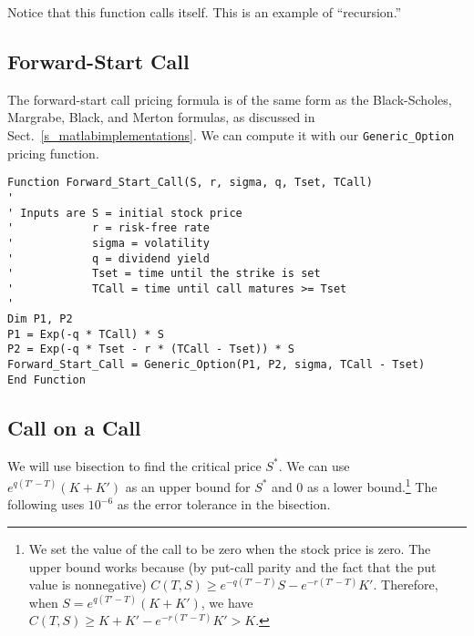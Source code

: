 \noindent Notice that this function calls itself.  This is an example of ``recursion.''


\subsection*{Forward-Start Call}

The forward-start call pricing formula is of the same form as the Black-Scholes, Margrabe, Black, and Merton formulas, as discussed in Sect.~\ref{s_matlabimplementations}.  We can compute it with our \verb!Generic_Option! pricing function.

\small\begin{verbatim}
Function Forward_Start_Call(S, r, sigma, q, Tset, TCall)
'
' Inputs are S = initial stock price
'            r = risk-free rate
'            sigma = volatility
'            q = dividend yield
'            Tset = time until the strike is set
'            TCall = time until call matures >= Tset
'
Dim P1, P2
P1 = Exp(-q * TCall) * S
P2 = Exp(-q * Tset - r * (TCall - Tset)) * S
Forward_Start_Call = Generic_Option(P1, P2, sigma, TCall - Tset)
End Function
\end{verbatim}\normalsize


\subsection*{Call on a Call}

We will use bisection to find the critical price $S^*$.  We can use $e^{q(T'-T)}(K+K')$ as an upper bound for $S^*$ and 0 as a lower bound.\footnote{We set the value of the call to be zero when the stock price is zero.  The upper bound works because (by put-call parity and the fact that the put value is nonnegative) $C(T,S) \geq e^{-q(T'-T)}S-e^{-r(T'-T)}K'$.  Therefore, when $S = e^{q(T'-T)}(K+K')$, we have 
$C(T,S) \geq K + K' - e^{-r(T'-T)}K' > K$.
}  
The following uses $10^{-6}$ as the error tolerance in the bisection.

